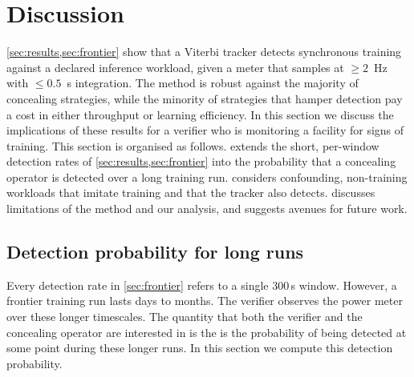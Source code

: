 \documentclass{article}
\begin{document}
\section{Discussion}
\label{sec:discussion}


\cref{sec:results,sec:frontier} show that a Viterbi tracker detects synchronous training against a declared
inference workload, given a meter that samples at ${\geq}2$~Hz with ${\leq}0.5$~s
integration. The method is robust against the majority of concealing strategies, while the minority of strategies that hamper detection pay a cost in either throughput or learning efficiency. In this section we discuss the implications of these results for a verifier who is monitoring a facility for signs of training. This section is organised as follows.  extends the short, per-window
detection rates of \cref{sec:results,sec:frontier} into the probability that a concealing operator is detected over a long training run.  considers confounding, non-training workloads that imitate training and that the tracker also detects.  discusses limitations of the method and our analysis, and suggests avenues for future work.

\subsection{Detection probability for long runs}
\label{subsec:runs}

Every detection rate in \cref{sec:frontier} refers to a single $300$\,s window. However, a frontier training run lasts days to months. The verifier observes the power meter over these longer timescales. The quantity that both the verifier and the concealing operator are interested in is the is the probability of being detected at some point during these longer runs. In this section we compute this detection probability.  
\end{document}
